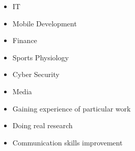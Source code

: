 \begin{itemize}
\item IT
\item Mobile Development
\item Finance
\item Sports Physiology
\item Cyber Security
\item Media

\end{itemize}
\begin{itemize}
\item Gaining experience of particular work
\item Doing real research
\item Communication skills improvement

\end{itemize}